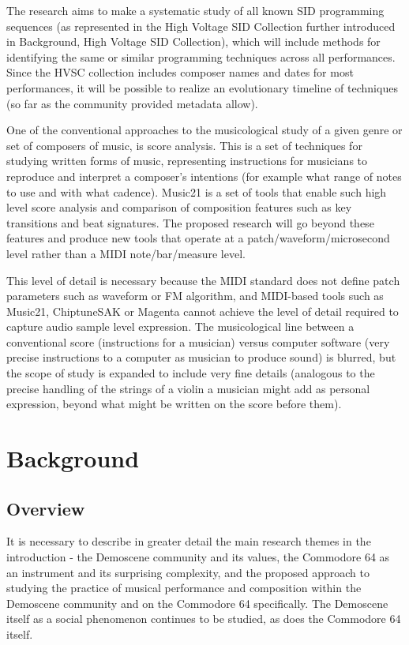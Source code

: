 \documentclass[10pt]{article}
\begin{document}
\begin{multicols*}{2}
The research aims to make a systematic study of all known SID programming sequences (as represented in the High Voltage SID Collection\cite{hvsc} further introduced in Background, High Voltage SID Collection), which will include methods for identifying the same or similar programming techniques across all performances. Since the HVSC collection includes composer names and dates for most performances, it will be possible to realize an evolutionary timeline of techniques (so far as the community provided metadata allow).

One of the conventional approaches to the musicological study of a given genre or set of composers of music, is score analysis. This is a set of techniques for studying written forms of music, representing instructions for musicians to reproduce and interpret a composer’s intentions (for example what range of notes to use and with what cadence). Music21\cite{music21} is a set of tools that enable such high level score analysis and comparison of composition features such as key transitions and beat signatures. The proposed research will go beyond these features and produce new tools that operate at a patch/waveform/microsecond level rather than a MIDI note/bar/measure level.

This level of detail is necessary because the MIDI standard does not define patch parameters such as waveform or FM algorithm, and MIDI-based tools such as Music21, ChiptuneSAK\cite{ChiptuneSAK} or Magenta\cite{Magenta} cannot achieve the level of detail required to capture audio sample level expression. The musicological line between a conventional score (instructions for a musician) versus computer software (very precise instructions to a computer as musician to produce sound) is blurred, but the scope of study is expanded to include very fine details (analogous to the precise handling of the strings of a violin a musician might add as personal expression, beyond what might be written on the score before them).

  \section{Background}

  \subsection{Overview}

It is necessary to describe in greater detail the main research themes in the introduction - the Demoscene community and its values, the Commodore 64 as an instrument and its surprising complexity, and the proposed approach to studying the practice of musical performance and composition within the Demoscene community and on the Commodore 64 specifically. The Demoscene itself as a social phenomenon continues to be studied, as does the Commodore 64 itself.


\end{multicols*}
\end{document}
